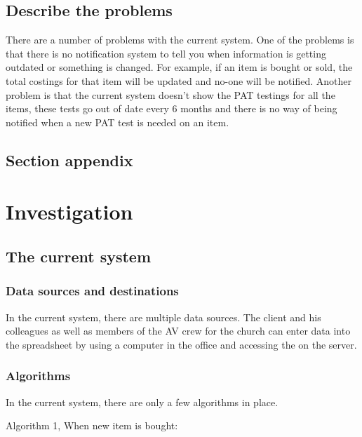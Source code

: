 \subsection{Describe the problems}

There are a number of problems with the current system. One of the problems is that there is no notification system to tell you when information is getting outdated or something is changed. For example, if an item is bought or sold, the total costings for that item will be updated and no-one will be notified. Another problem is that the current system doesn't show the PAT testings for all the items, these tests go out of date every 6 months and there is no way of being notified when a new PAT test is needed on an item.

\subsection{Section appendix}


\section{Investigation}

\subsection{The current system}

\subsubsection{Data sources and destinations}

In the current system, there are multiple data sources. The client and his colleagues as well as members of the AV crew for the church can enter data into the spreadsheet by using a computer in the office and accessing the on the server.

\subsubsection{Algorithms}

In the current system, there are only a few algorithms in place.
\bigskip

\begin{algorithm}[H]
    \caption{Algorithm 1, When new item is bought:}
\begin{algorithmic}[1]
\EndIf
\end{algorithmic}
\end{algorithm}

